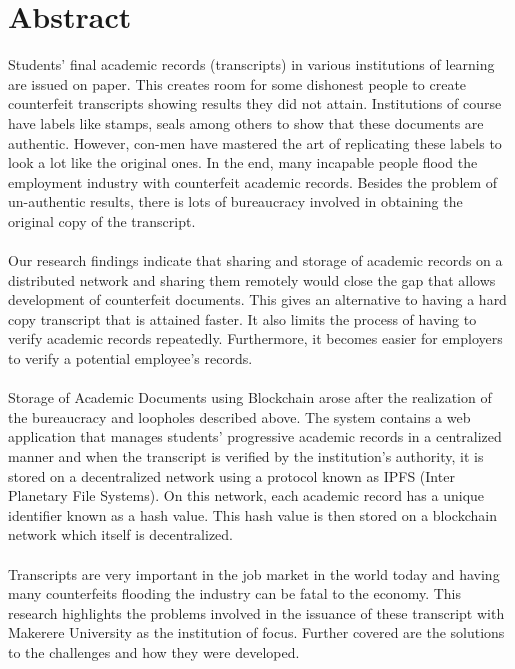 \chapter*{Abstract}
Students' final academic records (transcripts) in various institutions of learning are issued on paper. This creates room for some dishonest people to create counterfeit transcripts showing results they did not attain. Institutions of course have labels like stamps, seals among others to show that these documents are authentic. However, con-men have mastered the art of replicating these labels to look a lot like the original ones. In the end, many incapable people flood the employment industry with counterfeit academic records. Besides the problem of un-authentic results, there is lots of bureaucracy involved in obtaining the original copy of the transcript.\\\\
Our research findings indicate that sharing and storage of academic records on a distributed network and sharing them remotely would close the gap that allows development of counterfeit documents. This gives an alternative to having a hard copy transcript that is attained faster. It also limits the process of having to verify academic records repeatedly. Furthermore, it becomes easier for employers to verify a potential employee's records.\\\\
Storage of Academic Documents using Blockchain arose after the realization of the bureaucracy and loopholes described above. The system contains a web application that manages students' progressive academic records in a centralized manner and when the transcript is verified by the institution's authority, it is stored on a decentralized network using a protocol known as IPFS (Inter Planetary File Systems). On this network, each academic record has a unique identifier known as a hash value. This hash value is then stored on a blockchain network which itself is decentralized.\\\\
Transcripts are very important in the job market in the world today and having many counterfeits flooding the industry can be fatal to the economy. This research highlights the problems involved in the issuance of these transcript with Makerere University as the institution of focus. Further covered are the solutions to the challenges and how they were developed.

